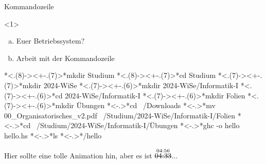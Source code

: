 \begin{frame}[fragile]{Kommandozeile}
    \begin{onlyenv}<1> %
    \begin{exercise}
        \begin{enumerate}[a)]
            \item Euer Betriebssystem?
            \item Arbeit mit der Kommandozeile
        \end{enumerate}
    \end{exercise}
    \end{onlyenv}
    \pause[]
    \begin{solve}
        \begin{plainbash}
*\only<.(8)->{\vspace{-\baselineskip}}\onslide<+-.(7)>*mkdir Studium
*\only<.(8)->{\vspace{-\baselineskip}}\onslide<+-.(7)>*cd Studium
*\only<.(7)->{\vspace{-\baselineskip}}\onslide<+-.(7)>*mkdir 2024-WiSe
*\only<.(7)->{\vspace{-\baselineskip}}\onslide<+-.(6)>*mkdir 2024-WiSe/Informatik-I
*\only<.(7)->{\vspace{-\baselineskip}}\onslide<+-.(6)>*cd 2024-WiSe/Informatik-I
*\only<.(7)->{\vspace{-\baselineskip}}\onslide<+-.(6)>*mkdir Folien
*\only<.(7)->{\vspace{-\baselineskip}}\onslide<+-.(6)>*mkdir Übungen
*\only<-.>{\vspace{-\baselineskip}}\onslide<+->*cd ~/Downloads
*\only<-.>{\vspace{-2\baselineskip}}\onslide<+->*mv 00_Organisatorisches_v2.pdf ~/Studium/2024-WiSe/Informatik-I/Folien
*\only<-.>{\vspace{-\baselineskip}}\onslide<+->*cd ~/Studium/2024-WiSe/Informatik-I/Übungen
*\only<-.>{\vspace{-\baselineskip}}\onslide<+->*ghc -o hello hello.hs
*\only<-.>{\vspace{-\baselineskip}}\onslide<+->*ls
*\only<-.>{\vspace{-\baselineskip}}\onslide<+->*/hello
        \end{plainbash}
    \end{solve}
    \pause[15]
    \Tiny Hier sollte eine tolle Animation hin, aber es ist $\stackrel{\text{04:56}}{\text{\sout{04:33}}}$...
\end{frame}